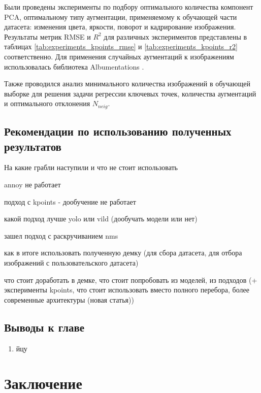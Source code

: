 \documentclass[a4paper,14pt]{article}
\begin{document}
    Были проведены эксперименты по подбору оптимального количества компонент PCA, оптимальному типу аугментации, применяемому к обучающей части датасета: изменения цвета, яркости, поворот и кадрирование изображения. 
    Результаты метрик RMSE и $R^2$ для различных экспериментов представлены в таблицах \ref{tab:experiments_kpoints_rmse} и \ref{tab:experiments_kpoints_r2} соответственно. Для применения случайных аугментаций к изображениям использовалась библиотека Albumentations \cite{albumentations}.
    
    Также проводился анализ  минимального количества изображений в обучающей выборке для решения задачи регрессии ключевых точек, количества аугментаций и оптимального отклонения $N_{neig}$.
    
    \subsection{Рекомендации по использованию полученных результатов}
    
    На какие грабли наступили и что не стоит использовать
    
    annoy не работает
    
    подход с kpoints - дообучение не работает
    
    какой подход лучше yolo или vild (дообучать модели или нет)
    
    зашел подход с раскручиванием nms
    
    как в итоге использовать полученную демку (для сбора датасета, для отбора изображений с пользовательского датасета)
    
    что стоит доработать в демке, что стоит попробовать из моделей, из подходов (+ эксперименты kpoints, что стоит использовать вместо полного перебора, более современные архитектуры (новая статья))
       
    \subsection{Выводы к главе \thesection}
    \begin{enumerate}
        [1)]
        \itemsep0em
        \item йцу
    \end{enumerate}

    \newpage


    \section{Заключение}
\end{document}
